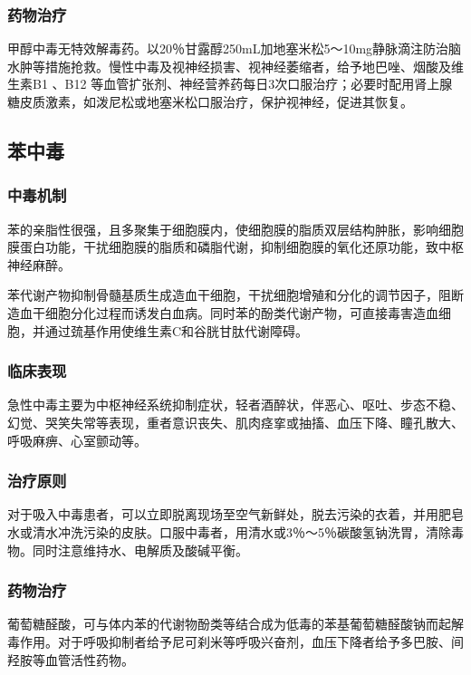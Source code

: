 \subsubsection{药物治疗}

甲醇中毒无特效解毒药。以20％甘露醇250mL加地塞米松5～10mg静脉滴注防治脑水肿等措施抢救。慢性中毒及视神经损害、视神经萎缩者，给予地巴唑、烟酸及维生素B{1}
、B{12}
等血管扩张剂、神经营养药每日3次口服治疗；必要时配用肾上腺糖皮质激素，如泼尼松或地塞米松口服治疗，保护视神经，促进其恢复。

\subsection{苯中毒}

\subsubsection{中毒机制}

苯的亲脂性很强，且多聚集于细胞膜内，使细胞膜的脂质双层结构肿胀，影响细胞膜蛋白功能，干扰细胞膜的脂质和磷脂代谢，抑制细胞膜的氧化还原功能，致中枢神经麻醉。

苯代谢产物抑制骨髓基质生成造血干细胞，干扰细胞增殖和分化的调节因子，阻断造血干细胞分化过程而诱发白血病。同时苯的酚类代谢产物，可直接毒害造血细胞，并通过巯基作用使维生素C和谷胱甘肽代谢障碍。

\subsubsection{临床表现}

急性中毒主要为中枢神经系统抑制症状，轻者酒醉状，伴恶心、呕吐、步态不稳、幻觉、哭笑失常等表现，重者意识丧失、肌肉痉挛或抽搐、血压下降、瞳孔散大、呼吸麻痹、心室颤动等。

\subsubsection{治疗原则}

对于吸入中毒患者，可以立即脱离现场至空气新鲜处，脱去污染的衣着，并用肥皂水或清水冲洗污染的皮肤。口服中毒者，用清水或3％～5％碳酸氢钠洗胃，清除毒物。同时注意维持水、电解质及酸碱平衡。

\subsubsection{药物治疗}

葡萄糖醛酸，可与体内苯的代谢物酚类等结合成为低毒的苯基葡萄糖醛酸钠而起解毒作用。对于呼吸抑制者给予尼可刹米等呼吸兴奋剂，血压下降者给予多巴胺、间羟胺等血管活性药物。

